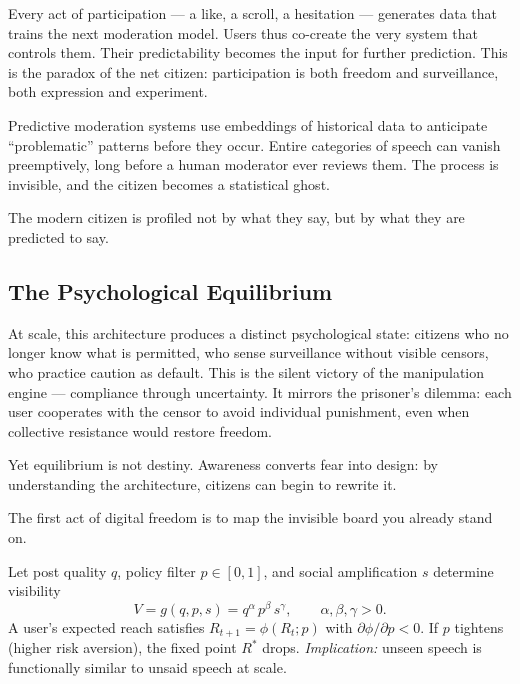 \documentclass[12pt,twoside]{book}
\begin{document}
Every act of participation --- a like, a scroll, a hesitation --- generates data that trains the next moderation model.  
Users thus co-create the very system that controls them.  
Their predictability becomes the input for further prediction.  
This is the paradox of the net citizen: participation is both freedom and surveillance, both expression and experiment.

Predictive moderation systems use embeddings of historical data to anticipate “problematic” patterns before they occur.  
Entire categories of speech can vanish preemptively, long before a human moderator ever reviews them.  
The process is invisible, and the citizen becomes a statistical ghost. \\

\begin{keyidea}
The modern citizen is profiled not by what they say, but by what they are predicted to say.
\end{keyidea}

\subsection*{The Psychological Equilibrium}

At scale, this architecture produces a distinct psychological state:  
citizens who no longer know what is permitted, who sense surveillance without visible censors, who practice caution as default.  
This is the silent victory of the manipulation engine --- compliance through uncertainty.  
It mirrors the prisoner’s dilemma: each user cooperates with the censor to avoid individual punishment, even when collective resistance would restore freedom.

Yet equilibrium is not destiny.  
Awareness converts fear into design: by understanding the architecture, citizens can begin to rewrite it. \\

\begin{keyidea}
The first act of digital freedom is to map the invisible board you already stand on.
\end{keyidea}
\begin{tcolorbox}[colback=gray!5,colframe=gray!60,boxrule=0.4pt,arc=1mm,
title=Mathematical Interlude: Visibility and Reach Equilibrium]
Let post quality $q$, policy filter $p\in[0,1]$, and social amplification $s$ determine visibility
\[
V = g(q,p,s) = q^\alpha\, p^\beta\, s^\gamma,\qquad \alpha,\beta,\gamma>0.
\]
A user’s expected reach satisfies $R_{t+1}=\phi(R_t; p)$ with $\partial \phi/\partial p<0$.  
If $p$ tightens (higher risk aversion), the fixed point $R^*$ drops.  
\textit{Implication:} unseen speech is functionally similar to unsaid speech at scale.
\end{tcolorbox}
\end{document}
